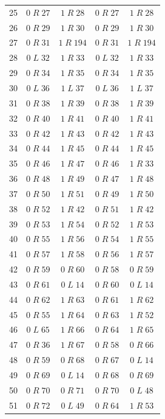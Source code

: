 \begin{longtable}{rcccc}
25 & $0\;R\;27$ & $1\;R\;28$ & $0\;R\;27$ & $1\;R\;28$\\
26 & $0\;R\;29$ & $1\;R\;30$ & $0\;R\;29$ & $1\;R\;30$\\
27 & $0\;R\;31$ & $1\;R\;194$ & $0\;R\;31$ & $1\;R\;194$\\
28 & $0\;L\;32$ & $1\;R\;33$ & $0\;L\;32$ & $1\;R\;33$\\
29 & $0\;R\;34$ & $1\;R\;35$ & $0\;R\;34$ & $1\;R\;35$\\
30 & $0\;L\;36$ & $1\;L\;37$ & $0\;L\;36$ & $1\;L\;37$\\
31 & $0\;R\;38$ & $1\;R\;39$ & $0\;R\;38$ & $1\;R\;39$\\
32 & $0\;R\;40$ & $1\;R\;41$ & $0\;R\;40$ & $1\;R\;41$\\
33 & $0\;R\;42$ & $1\;R\;43$ & $0\;R\;42$ & $1\;R\;43$\\
34 & $0\;R\;44$ & $1\;R\;45$ & $0\;R\;44$ & $1\;R\;45$\\
35 & $0\;R\;46$ & $1\;R\;47$ & $0\;R\;46$ & $1\;R\;33$\\
36 & $0\;R\;48$ & $1\;R\;49$ & $0\;R\;47$ & $1\;R\;48$\\
37 & $0\;R\;50$ & $1\;R\;51$ & $0\;R\;49$ & $1\;R\;50$\\
38 & $0\;R\;52$ & $1\;R\;42$ & $0\;R\;51$ & $1\;R\;42$\\
39 & $0\;R\;53$ & $1\;R\;54$ & $0\;R\;52$ & $1\;R\;53$\\
40 & $0\;R\;55$ & $1\;R\;56$ & $0\;R\;54$ & $1\;R\;55$\\
41 & $0\;R\;57$ & $1\;R\;58$ & $0\;R\;56$ & $1\;R\;57$\\
42 & $0\;R\;59$ & $0\;R\;60$ & $0\;R\;58$ & $0\;R\;59$\\
43 & $0\;R\;61$ & $0\;L\;14$ & $0\;R\;60$ & $0\;L\;14$\\
44 & $0\;R\;62$ & $1\;R\;63$ & $0\;R\;61$ & $1\;R\;62$\\
45 & $0\;R\;55$ & $1\;R\;64$ & $0\;R\;63$ & $1\;R\;52$\\
46 & $0\;L\;65$ & $1\;R\;66$ & $0\;R\;64$ & $1\;R\;65$\\
47 & $0\;R\;36$ & $1\;R\;67$ & $0\;R\;58$ & $0\;R\;66$\\
48 & $0\;R\;59$ & $0\;R\;68$ & $0\;R\;67$ & $0\;L\;14$\\
49 & $0\;R\;69$ & $0\;L\;14$ & $0\;R\;68$ & $0\;R\;69$\\
50 & $0\;R\;70$ & $0\;R\;71$ & $0\;R\;70$ & $0\;L\;48$\\
51 & $0\;R\;72$ & $0\;L\;49$ & $0\;R\;64$ & $1\;R\;53$\\

\end{longtable}
